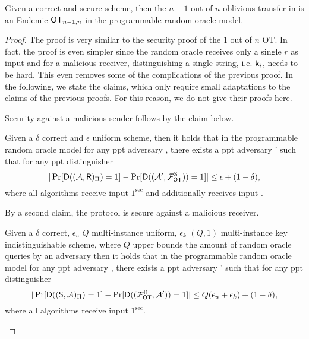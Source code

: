 \begin{lemma}\label{lem:allbutone}
Given a correct and secure \UKA scheme, then the $n-1$ out of $n$ oblivious transfer in   is an Endemic $\mathsf{OT}_{n-1,n}$ in the programmable random oracle model. 
\end{lemma}

\begin{proof}
The proof is very similar to the security proof of the $1$ out of $n$ OT. In fact, the proof is even simpler since the random oracle receives only a single $r$ as input and for a malicious receiver, distinguishing a single string, i.e. $\mathsf{k}_{i}$, needs to be hard. This even removes some of the complications of the previous proof. In the following, we state the claims, which only require small adaptations to the claims of the previous proofs. For this reason, we do not give their proofs here. 

Security against a malicious sender follows by the claim below. 
\begin{claim}\label{claim:malsender}
Given a $\delta$ correct and $\epsilon$ uniform \UKA scheme, then it holds that in the programmable random oracle model for any ppt adversary \Adv, there exists a ppt adversary \Adv' such that for any ppt distinguisher \D
$$
|\Pr[\mathsf D((\mathcal{A},\mathsf{R})_{\Pi})=1] -\Pr[\mathsf D( (\mathcal{A}', \mathcal{F}_{\mathsf{OT}}^\mathsf{S}))=1]|\leq \epsilon+(1-\delta),
$$
where all algorithms receive input $1^\sec$ and \rec additionally receives input \set.
\end{claim}


By a second claim, the protocol is secure against a malicious receiver.
\begin{claim}\label{claim:malreceiver}
Given a $\delta$ correct, $\epsilon_u$ $Q$ multi-instance uniform, $\epsilon_k$ $(Q,1)$ multi-instance key indistinguishable  \UKA scheme, where $Q$ upper bounds the amount of random oracle queries by an adversary then it holds that in the programmable random oracle model for any ppt adversary \Adv, there exists a ppt adversary \Adv' such that for any ppt distinguisher \D
$$
|\Pr[\mathsf D((\mathsf{S}, \mathcal{A})_{\Pi})=1] -\Pr[\mathsf D((\mathcal{F}_{\mathsf{OT}}^\mathsf{R},\mathcal{A}'))=1]|\leq Q(\epsilon_{u}+\epsilon_{k})+(1-\delta),
$$
where all algorithms receive input $1^\sec$.
\end{claim}
\pe
\end{proof}

